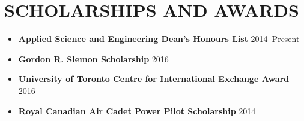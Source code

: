 \documentclass{ResumeTemplate}
\begin{document}
\begin{minipage}[c]{0.65\linewidth}
		\section{SCHOLARSHIPS AND AWARDS}	
		\begin{itemize}[noitemsep, leftmargin=*]
			\item \textbf{Applied Science and Engineering Dean's Honours List} \hfill 2014--Present
			\item \textbf{Gordon R. Slemon Scholarship} \hfill 2016
			\item \textbf{University of Toronto Centre for International Exchange Award} \hfill 2016
			\item \textbf{Royal Canadian Air Cadet Power Pilot Scholarship} \hfill 2014
		\end{itemize}

	\end{minipage}
	\hspace{0.01\linewidth}
\end{document}
